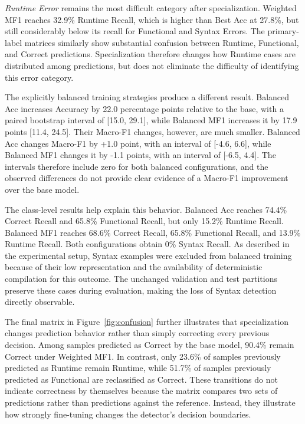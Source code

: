 \emph{Runtime Error} remains the most difficult category after specialization. Weighted MF1 reaches 32.9\% Runtime Recall, which is higher than Best Acc at 27.8\%, but still considerably below its recall for Functional and Syntax Errors. The primary-label matrices similarly show substantial confusion between Runtime, Functional, and Correct predictions. Specialization therefore changes how Runtime cases are distributed among predictions, but does not eliminate the difficulty of identifying this error category.

The explicitly balanced training strategies produce a different result. Balanced Acc increases Accuracy by 22.0 percentage points relative to the base, with a paired bootstrap interval of [15.0, 29.1], while Balanced MF1 increases it by 17.9 points [11.4, 24.5]. Their Macro-F1 changes, however, are much smaller. Balanced Acc changes Macro-F1 by +1.0 point, with an interval of [-4.6, 6.6], while Balanced MF1 changes it by -1.1 points, with an interval of [-6.5, 4.4]. The intervals therefore include zero for both balanced configurations, and the observed differences do not provide clear evidence of a Macro-F1 improvement over the base model.

The class-level results help explain this behavior. Balanced Acc reaches 74.4\% Correct Recall and 65.8\% Functional Recall, but only 15.2\% Runtime Recall. Balanced MF1 reaches 68.6\% Correct Recall, 65.8\% Functional Recall, and 13.9\% Runtime Recall. Both configurations obtain 0\% Syntax Recall. As described in the experimental setup, Syntax examples were excluded from balanced training because of their low representation and the availability of deterministic compilation for this outcome. The unchanged validation and test partitions preserve these cases during evaluation, making the loss of Syntax detection directly observable.

The final matrix in Figure~\ref{fig:confusion} further illustrates that specialization changes prediction behavior rather than simply correcting every previous decision. Among samples predicted as Correct by the base model, 90.4\% remain Correct under Weighted MF1. In contrast, only 23.6\% of samples previously predicted as Runtime remain Runtime, while 51.7\% of samples previously predicted as Functional are reclassified as Correct. These transitions do not indicate correctness by themselves because the matrix compares two sets of predictions rather than predictions against the reference. Instead, they illustrate how strongly fine-tuning changes the detector's decision boundaries.

